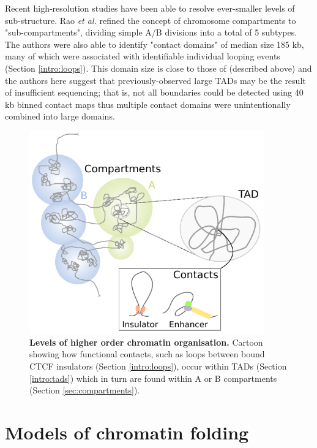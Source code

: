 \documentclass[a4paper,11pt,oneside]{book}
\begin{document}
Recent high-resolution studies have been able to resolve ever-smaller levels of sub-structure. Rao \emph{et al.}\cite{Rao2014} refined the concept of chromosome compartments to "sub-compartments", dividing simple A/B divisions into a total of 5 subtypes. The authors were also able to identify "contact domains" of median size 185 kb, many of which were associated with identifiable individual looping events (Section \ref{intro:loops}).\cite{Rao2014} This domain size is close to those of \citet{Filippova2014} (described above) and the authors here suggest that previously-observed large TADs may be the result of insufficient sequencing; that is, not all boundaries could be detected using 40 kb binned contact maps thus multiple contact domains were unintentionally combined into large domains.

\begin{figure}
\begin{center}
\includegraphics[width=4in]{figs/genome_org.pdf}
\captionsetup{width=\textwidth}
\caption[Levels of higher order chromatin organisation.]{ {\bf Levels of higher order chromatin organisation. } 
  Cartoon showing how functional contacts, such as loops between bound CTCF insulators (Section \ref{intro:loops}), occur within TADs (Section \ref{intro:tads}) which in turn are found within A or B compartments (Section \ref{sec:compartments}).
}\label{fig:genomeorg}
\end{center}
\end{figure} 

\section{Models of chromatin folding}
\end{document}
